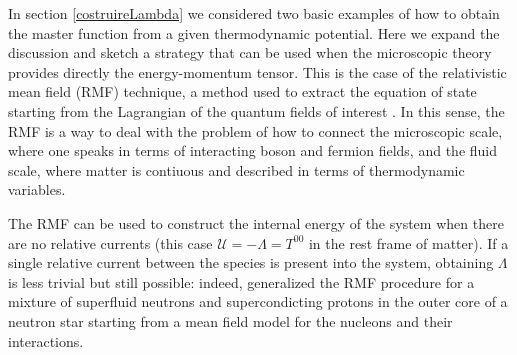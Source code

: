 \documentclass[usenatbib]{mnras}
\begin{document}
In section \ref{costruireLambda} we considered two basic examples of how to obtain the master function from a given thermodynamic potential. Here we expand the discussion and sketch a strategy that can be used when the microscopic theory provides directly the energy-momentum tensor. This is the case of the relativistic mean field (RMF) technique, a method used to extract the equation of state starting from the  Lagrangian of the quantum fields of interest \citep{glendenning_book}. In this sense, the RMF is a  way to deal with the problem of how to connect the microscopic scale, where one speaks in terms of interacting boson and fermion fields, and the fluid scale, where matter is contiuous and described in terms of thermodynamic variables.

The RMF can be used to construct the internal energy of the system when there are no relative currents (this case $\mathcal{U}=-\Lambda=T^{00}$ in the rest frame of matter). If a single relative current  between the species is present into the system, obtaining $\Lambda$ is less trivial but still possible: indeed, \cite{comerRMF} generalized the RMF procedure for a mixture of superfluid neutrons and supercondicting protons in the outer core of a neutron star starting from a mean field model for the nucleons and their interactions.
\end{document}
